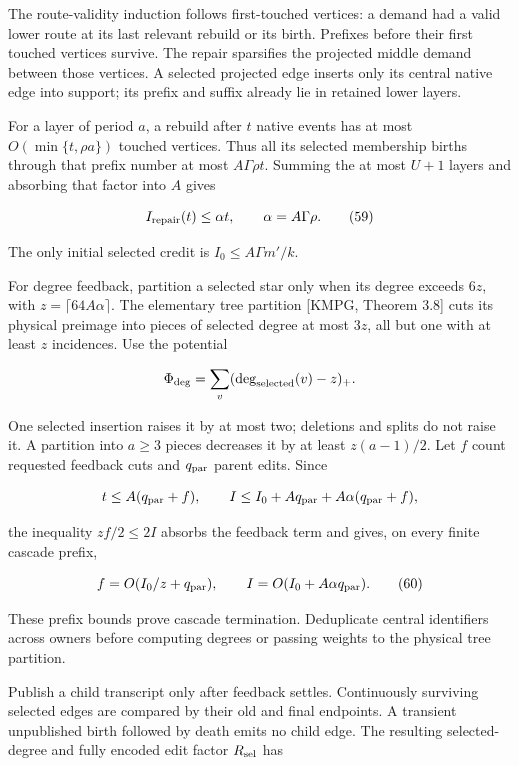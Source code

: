 The route-validity induction follows first-touched vertices: a demand had a valid lower route at its last relevant rebuild or its birth. Prefixes before their first touched vertices survive. The repair sparsifies the projected middle demand between those vertices. A selected projected edge inserts only its central native edge into support; its prefix and suffix already lie in retained lower layers.

For a layer of period \(a\), a rebuild after \(t\) native events has at most \(O(\min\{t,\rho a\})\) touched vertices. Thus all its selected membership births through that prefix number at most \(A\Gamma\rho t\). Summing the at most \(U+1\) layers and absorbing that factor into \(A\) gives

\[
I_{\rm repair}(t)\leq \alpha t,\qquad
 \alpha=A\Gamma\rho.
 \tag{59}
\]

The only initial selected credit is \(I_0\leq A\Gamma m'/k\).

For degree feedback, partition a selected star only when its degree exceeds \(6z\), with \(z=\lceil64A\alpha\rceil\). The elementary tree partition {[}KMPG, Theorem 3.8{]} cuts its physical preimage into pieces of selected degree at most \(3z\), all but one with at least \(z\) incidences. Use the potential

\[
\Phi_{\rm deg}=\sum_v(\deg_{\rm selected}(v)-z)_+.
\]

One selected insertion raises it by at most two; deletions and splits do not raise it. A partition into \(a\geq3\) pieces decreases it by at least \(z(a-1)/2\). Let \(f\) count requested feedback cuts and \(q_{\rm par}\) parent edits. Since

\[
t\leq A(q_{\rm par}+f),\qquad
 I\leq I_0+Aq_{\rm par}+A\alpha(q_{\rm par}+f),
\]

the inequality \(zf/2\leq2I\) absorbs the feedback term and gives, on every finite cascade prefix,

\[
f=O(I_0/z+q_{\rm par}),\qquad
 I=O(I_0+A\alpha q_{\rm par}).
 \tag{60}
\]

These prefix bounds prove cascade termination. Deduplicate central identifiers across owners before computing degrees or passing weights to the physical tree partition.

Publish a child transcript only after feedback settles. Continuously surviving selected edges are compared by their old and final endpoints. A transient unpublished birth followed by death emits no child edge. The resulting selected-degree and fully encoded edit factor \(R_{\rm sel}\) has

